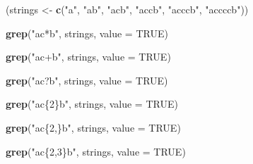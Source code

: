 \documentclass[]{book}
\newenvironment{Shaded}{\begin{snugshade}}{\end{snugshade}}
\newcommand{\KeywordTok}[1]{\textcolor[rgb]{0.13,0.29,0.53}{\textbf{#1}}}
\newcommand{\DataTypeTok}[1]{\textcolor[rgb]{0.13,0.29,0.53}{#1}}
\newcommand{\StringTok}[1]{\textcolor[rgb]{0.31,0.60,0.02}{#1}}
\newcommand{\OtherTok}[1]{\textcolor[rgb]{0.56,0.35,0.01}{#1}}
\newcommand{\NormalTok}[1]{#1}
\theoremstyle{definition}
\theoremstyle{definition}
\theoremstyle{definition}
\theoremstyle{remark}
\begin{document}
\begin{Shaded}
\begin{Highlighting}[]
\NormalTok{(strings <-}\StringTok{ }\KeywordTok{c}\NormalTok{(}\StringTok{"a"}\NormalTok{, }\StringTok{"ab"}\NormalTok{, }\StringTok{"acb"}\NormalTok{, }\StringTok{"accb"}\NormalTok{, }\StringTok{"acccb"}\NormalTok{, }\StringTok{"accccb"}\NormalTok{))}
\end{Highlighting}
\end{Shaded}

\begin{Shaded}
\begin{Highlighting}[]
\KeywordTok{grep}\NormalTok{(}\StringTok{"ac*b"}\NormalTok{, strings, }\DataTypeTok{value =} \OtherTok{TRUE}\NormalTok{)}
\end{Highlighting}
\end{Shaded}

\begin{Shaded}
\begin{Highlighting}[]
\KeywordTok{grep}\NormalTok{(}\StringTok{"ac+b"}\NormalTok{, strings, }\DataTypeTok{value =} \OtherTok{TRUE}\NormalTok{)}
\end{Highlighting}
\end{Shaded}

\begin{Shaded}
\begin{Highlighting}[]
\KeywordTok{grep}\NormalTok{(}\StringTok{"ac?b"}\NormalTok{, strings, }\DataTypeTok{value =} \OtherTok{TRUE}\NormalTok{)}
\end{Highlighting}
\end{Shaded}

\begin{Shaded}
\begin{Highlighting}[]
\KeywordTok{grep}\NormalTok{(}\StringTok{"ac\{2\}b"}\NormalTok{, strings, }\DataTypeTok{value =} \OtherTok{TRUE}\NormalTok{)}
\end{Highlighting}
\end{Shaded}

\begin{Shaded}
\begin{Highlighting}[]
\KeywordTok{grep}\NormalTok{(}\StringTok{"ac\{2,\}b"}\NormalTok{, strings, }\DataTypeTok{value =} \OtherTok{TRUE}\NormalTok{)}
\end{Highlighting}
\end{Shaded}

\begin{Shaded}
\begin{Highlighting}[]
\KeywordTok{grep}\NormalTok{(}\StringTok{"ac\{2,3\}b"}\NormalTok{, strings, }\DataTypeTok{value =} \OtherTok{TRUE}\NormalTok{)}
\end{Highlighting}
\end{Shaded}
\end{document}
